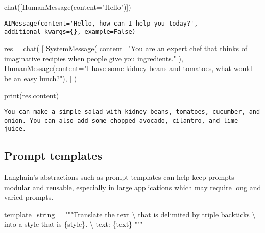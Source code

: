\documentclass[
  letterpaper,
  DIV=11,
  numbers=noendperiod]{scrreprt}
\newenvironment{Shaded}{\begin{snugshade}}{\end{snugshade}}
\newcommand{\BuiltInTok}[1]{\textcolor[rgb]{0.00,0.23,0.31}{#1}}
\newcommand{\CharTok}[1]{\textcolor[rgb]{0.13,0.47,0.30}{#1}}
\newcommand{\NormalTok}[1]{\textcolor[rgb]{0.00,0.23,0.31}{#1}}
\newcommand{\OperatorTok}[1]{\textcolor[rgb]{0.37,0.37,0.37}{#1}}
\newcommand{\SpecialCharTok}[1]{\textcolor[rgb]{0.37,0.37,0.37}{#1}}
\newcommand{\StringTok}[1]{\textcolor[rgb]{0.13,0.47,0.30}{#1}}
\begin{document}
\begin{Shaded}
\begin{Highlighting}[]
\NormalTok{chat([HumanMessage(content}\OperatorTok{=}\StringTok{"Hello"}\NormalTok{)])}
\end{Highlighting}
\end{Shaded}

\begin{verbatim}
AIMessage(content='Hello, how can I help you today?', additional_kwargs={}, example=False)
\end{verbatim}

\begin{Shaded}
\begin{Highlighting}[]
\NormalTok{res }\OperatorTok{=}\NormalTok{ chat(}
\NormalTok{    [}
\NormalTok{        SystemMessage(}
\NormalTok{            content}\OperatorTok{=}\StringTok{"You are an expert chef that thinks of imaginative recipies when people give you ingredients."}
\NormalTok{        ),}
\NormalTok{        HumanMessage(content}\OperatorTok{=}\StringTok{"I have some kidney beans and tomatoes, what would be an easy lunch?"}\NormalTok{),}
\NormalTok{    ]}
\NormalTok{)}

\BuiltInTok{print}\NormalTok{(res.content)}
\end{Highlighting}
\end{Shaded}

\begin{verbatim}
You can make a simple salad with kidney beans, tomatoes, cucumber, and onion. You can also add some chopped avocado, cilantro, and lime juice.
\end{verbatim}

\hypertarget{prompt-templates}{%
\subsection{Prompt templates}\label{prompt-templates}}

Langhain's abstractions such as prompt templates can help keep prompts
modular and reusable, especially in large applications which may require
long and varied prompts.

\begin{Shaded}
\begin{Highlighting}[]
\NormalTok{template\_string }\OperatorTok{=} \StringTok{"""Translate the text }\CharTok{\textbackslash{}}
\StringTok{that is delimited by triple backticks }\CharTok{\textbackslash{}}
\StringTok{into a style that is }\SpecialCharTok{\{style\}}\StringTok{. }\CharTok{\textbackslash{}}
\StringTok{text: \textasciigrave{}\textasciigrave{}\textasciigrave{}}\SpecialCharTok{\{text\}}\StringTok{\textasciigrave{}\textasciigrave{}\textasciigrave{}}
\StringTok{"""}
\end{Highlighting}
\end{Shaded}
\end{document}
